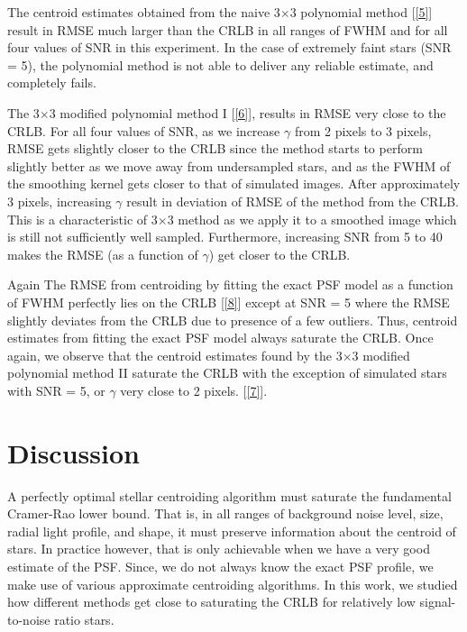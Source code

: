 \documentclass[12pt, preprint]{aastex}
\begin{document}
The centroid estimates obtained from the naive 3$\times$3 polynomial method [\ref{5}]
result in RMSE much larger than the CRLB in all ranges of FWHM and for all four
values of SNR in this experiment. In the case of extremely faint stars (SNR = 5),
the polynomial method is not able to deliver any reliable estimate, and completely fails.

The 3$\times$3 modified polynomial method I [\ref{6}], results in RMSE very close to the CRLB.
For all four values of SNR, as we increase $\gamma$ from 2 pixels to 3 pixels,
RMSE gets slightly closer to the CRLB since the method starts to perform
slightly better as we move away from undersampled stars, and as the FWHM of the smoothing kernel
gets closer to that of simulated images.
After approximately 3 pixels, increasing $\gamma$ result in deviation of RMSE of the method from the CRLB.
This is a characteristic of 3$\times$3 method as we apply it to a smoothed image which is still not sufficiently
well sampled.  Furthermore, increasing SNR from 5 to 40 makes the RMSE (as a function of $\gamma$) get
closer to the CRLB.

Again The RMSE from centroiding by fitting the exact PSF model as a function of FWHM
perfectly lies on the CRLB [\ref{8}] except at SNR = 5 where the RMSE slightly deviates
from the CRLB due to presence of a few outliers. Thus, centroid estimates from fitting
the exact PSF model always saturate the CRLB. Once again, we observe that the centroid
estimates found by the 3$\times$3 modified polynomial method II saturate the CRLB with the
exception of simulated stars with SNR = 5, or $\gamma$ very close to 2 pixels. [\ref{7}].

\section{Discussion}\label{sec:discussion}

A perfectly optimal stellar centroiding algorithm must saturate the fundamental Cramer-Rao lower 
bound. That is, in all ranges of background noise level, size, radial light profile,
and shape, it must preserve information about the centroid of stars. In practice however,
that is only achievable when we have a very good estimate of the PSF. Since, we do not always 
know the exact PSF profile, we make use of various approximate centroiding algorithms. In this work, we
studied how different methods get close to saturating the CRLB for relatively low signal-to-noise ratio
stars.
 
\end{document}
